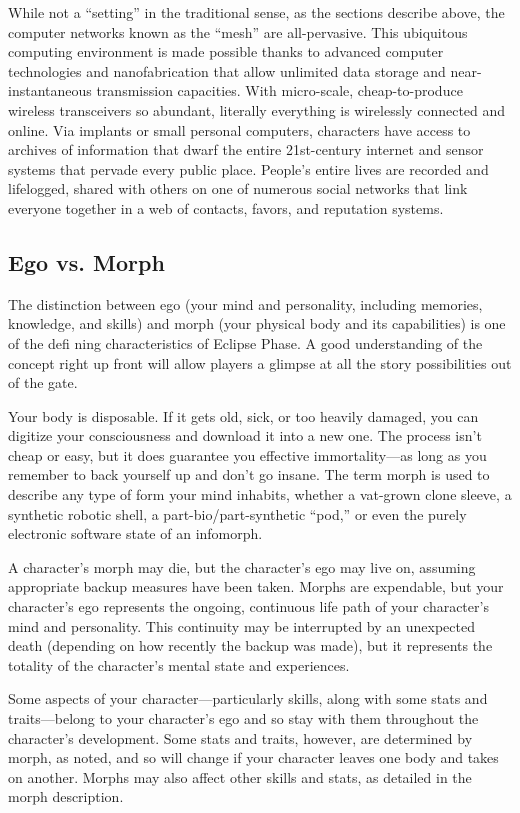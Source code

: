 While not a ``setting'' in the traditional sense, as the sections
describe above, the computer networks known as the ``mesh'' are
all-pervasive. This ubiquitous computing environment is made possible
thanks to advanced computer technologies and nanofabrication that
allow unlimited data storage and near-instantaneous transmission
capacities. With micro-scale, cheap-to-produce wireless transceivers
so abundant, literally everything is wirelessly connected and
online. Via implants or small personal computers, characters have
access to archives of information that dwarf the entire 21st-century
internet and sensor systems that pervade every public place. People's
entire lives are recorded and lifelogged, shared with others on one of
numerous social networks that link everyone together in a web of
contacts, favors, and reputation systems.

\subsection{Ego vs. Morph}
\label{sec:ego-vs.-morph}

The distinction between ego (your mind and personality, including
memories, knowledge, and skills) and morph (your physical body and its
capabilities) is one of the defi ning characteristics of Eclipse
Phase. A good understanding of the concept right up front will allow
players a glimpse at all the story possibilities out of the gate.

Your body is disposable. If it gets old, sick, or too heavily damaged,
you can digitize your consciousness and download it into a new
one. The process isn't cheap or easy, but it does guarantee you
effective immortality—as long as you remember to back yourself up and
don't go insane. The term morph is used to describe any type of form
your mind inhabits, whether a vat-grown clone sleeve, a synthetic
robotic shell, a part-bio/part-synthetic ``pod,'' or even the purely
electronic software state of an infomorph.

A character's morph may die, but the character's ego may live on,
assuming appropriate backup measures have been taken. Morphs are
expendable, but your character's ego represents the ongoing,
continuous life path of your character's mind and personality. This
continuity may be interrupted by an unexpected death (depending on how
recently the backup was made), but it represents the totality of the
character's mental state and experiences.

Some aspects of your character—particularly skills, along with some
stats and traits—belong to your character's ego and so stay with them
throughout the character's development. Some stats and traits,
however, are determined by morph, as noted, and so will change if your
character leaves one body and takes on another. Morphs may also affect
other skills and stats, as detailed in the morph description.

